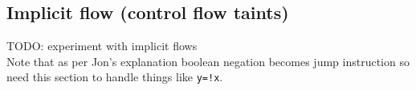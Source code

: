 \documentclass[a4paper]{article}
\newcommand{\todo}[1]{{\color{red}TODO: #1\\}}
\begin{document}
\subsection{Implicit flow (control flow taints)}
\todo{experiment with implicit flows}
Note that as per Jon's explanation boolean negation becomes jump instruction so need
this section to handle things like \verb|y=!x|.

\nocite{*}


\end{document}
